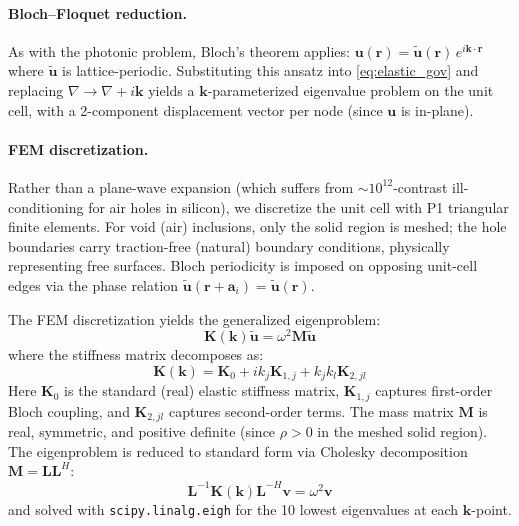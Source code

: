 \documentclass[11pt]{article}
\begin{document}
\paragraph{Bloch--Floquet reduction.} As with the photonic problem, Bloch's theorem applies: $\mathbf{u}(\mathbf{r}) = \tilde{\mathbf{u}}(\mathbf{r})\,e^{i\mathbf{k}\cdot\mathbf{r}}$ where $\tilde{\mathbf{u}}$ is lattice-periodic. Substituting this ansatz into \cref{eq:elastic_gov} and replacing $\nabla \to \nabla + i\mathbf{k}$ yields a $\mathbf{k}$-parameterized eigenvalue problem on the unit cell, with a 2-component displacement vector per node (since $\mathbf{u}$ is in-plane).

\paragraph{FEM discretization.} Rather than a plane-wave expansion (which suffers from $\sim 10^{12}$-contrast ill-conditioning for air holes in silicon), we discretize the unit cell with P1 triangular finite elements. For void (air) inclusions, only the solid region is meshed; the hole boundaries carry traction-free (natural) boundary conditions, physically representing free surfaces. Bloch periodicity is imposed on opposing unit-cell edges via the phase relation $\tilde{\mathbf{u}}(\mathbf{r} + \mathbf{a}_i) = \tilde{\mathbf{u}}(\mathbf{r})$.

The FEM discretization yields the generalized eigenproblem:
\begin{equation}
    \mathbf{K}(\mathbf{k})\tilde{\mathbf{u}} = \omega^2\mathbf{M}\tilde{\mathbf{u}}
    \label{eq:fem}
\end{equation}
where the stiffness matrix decomposes as:
\begin{equation}
    \mathbf{K}(\mathbf{k}) = \mathbf{K}_0 + ik_j\mathbf{K}_{1,j} + k_jk_l\mathbf{K}_{2,jl}
\end{equation}
Here $\mathbf{K}_0$ is the standard (real) elastic stiffness matrix, $\mathbf{K}_{1,j}$ captures first-order Bloch coupling, and $\mathbf{K}_{2,jl}$ captures second-order terms. The mass matrix $\mathbf{M}$ is real, symmetric, and positive definite (since $\rho > 0$ in the meshed solid region). The eigenproblem is reduced to standard form via Cholesky decomposition $\mathbf{M} = \mathbf{L}\mathbf{L}^H$:
\begin{equation}
    \mathbf{L}^{-1}\mathbf{K}(\mathbf{k})\mathbf{L}^{-H}\mathbf{v} = \omega^2\mathbf{v}
\end{equation}
and solved with \texttt{scipy.linalg.eigh} for the 10 lowest eigenvalues at each $\mathbf{k}$-point.
\end{document}
